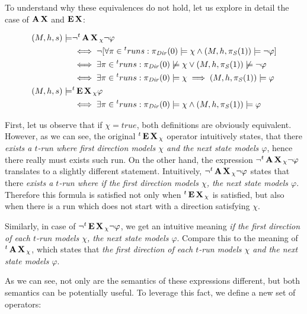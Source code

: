 To understand why these equivalences do not hold, let us explore in detail the case of $\operatorname{\mathbf{A}}\operatorname{\mathbf{X}}$ and $\operatorname{\mathbf{E}}\operatorname{\mathbf{X}}$:

\begin{align*}
		(M, h, s) \models & \neg {}^{t}\operatorname{\mathbf{A}}\operatorname{\mathbf{X}}{}_{\chi} \neg \varphi	\\	
			& \iff  \neg [ \forall \pi \in {}^{t}runs  : \pi_{\mathit{Dir}}(0) \models \chi \land (M, h, \pi_{\mathit{S}}(1)) \models \neg \varphi ] \\
			& \iff  \exists \pi \in {}^{t}runs  : \pi_{\mathit{Dir}}(0) \not\models \chi \lor (M, h, \pi_{\mathit{S}}(1)) \not\models \neg \varphi \\ 
			& \iff  \exists \pi \in {}^{t}runs  : \pi_{\mathit{Dir}}(0) \models \chi \implies (M, h, \pi_{\mathit{S}}(1)) \models \varphi \\
		(M, h, s) \models & {}^{t}\operatorname{\mathbf{E}}\operatorname{\mathbf{X}}{}_{\chi} \varphi \\		
			& \iff \exists \pi \in {}^{t}runs  : \pi_{\mathit{Dir}}(0) \models \chi \land (M, h, \pi_{\mathit{S}}(1)) \models \varphi \\
\end{align*}

First, let us observe that if $\chi = true$, both definitions are obviously equivalent. However, as we can see, the original ${}^{t}\operatorname{\mathbf{E}}\operatorname{\mathbf{X}}{}_{\chi}$ operator intuitively states, that there \emph{exists a $t$-run where first direction models $\chi$ and the next state models $\varphi$}, hence there really must exists such run. On the other hand, the expression $\neg {}^{t}\operatorname{\mathbf{A}}\operatorname{\mathbf{X}}{}_{\chi} \neg \varphi$ translates to a slightly different statement. Intuitively, $\neg {}^{t}\operatorname{\mathbf{A}}\operatorname{\mathbf{X}}{}_{\chi} \neg \varphi$ states that there \emph{exists a $t$-run where if the first direction models $\chi$, the next state models $\varphi$}. Therefore this formula is satisfied not only when ${}^{t}\operatorname{\mathbf{E}}\operatorname{\mathbf{X}}{}_{\chi}$ is satisfied, but also when there is a run which does not start with a direction satisfying $\chi$.

Similarly, in case of $\neg {}^{t}\operatorname{\mathbf{E}}\operatorname{\mathbf{X}}{}_{\chi} \neg \varphi$, we get an intuitive meaning \emph{if the first direction of each $t$-run models $\chi$, the next state models $\varphi$}. Compare this to the meaning of ${}^{t}\operatorname{\mathbf{A}}\operatorname{\mathbf{X}}{}_{\chi}$, which states that \emph{the first direction of each $t$-run models $\chi$ and the next state models $\varphi$}.

As we can see, not only are the semantics of these expressions different, but both semantics can be potentially useful. To leverage this fact, we define a new set of operators:

